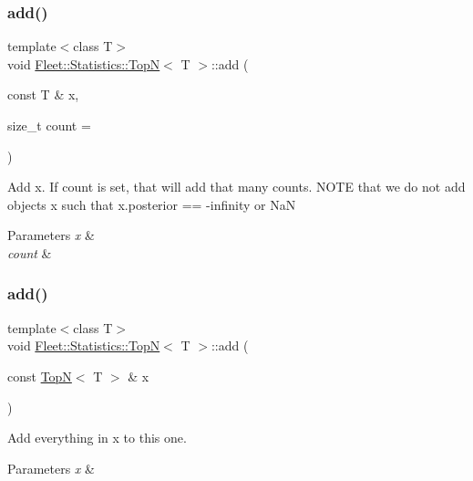 \subsubsection{\texorpdfstring{add()}{add()}\hspace{0.1cm}{\footnotesize\ttfamily [1/2]}}
{\footnotesize\ttfamily template$<$class T$>$ \\
void \hyperlink{class_fleet_1_1_statistics_1_1_top_n}{Fleet\+::\+Statistics\+::\+TopN}$<$ T $>$\+::add (\begin{DoxyParamCaption}\item[{const T \&}]{x,  }\item[{size\+\_\+t}]{count = {} }\end{DoxyParamCaption})\hspace{0.3cm}{\ttfamily [inline]}}

Add x. If count is set, that will add that many counts. N\+O\+TE that we do not add objects x such that x.\+posterior == -\/infinity or NaN 
\begin{DoxyParams}{Parameters}
{\em x} & \\
\hline
{\em count} & \\
\hline
\end{DoxyParams}
\mbox{\label{class_fleet_1_1_statistics_1_1_top_n_ac1a720c5f52f0486377274bd1e6a052a}} 
\subsubsection{\texorpdfstring{add()}{add()}\hspace{0.1cm}{\footnotesize\ttfamily [2/2]}}
{\footnotesize\ttfamily template$<$class T$>$ \\
void \hyperlink{class_fleet_1_1_statistics_1_1_top_n}{Fleet\+::\+Statistics\+::\+TopN}$<$ T $>$\+::add (\begin{DoxyParamCaption}\item[{const \hyperlink{class_fleet_1_1_statistics_1_1_top_n}{TopN}$<$ T $>$ \&}]{x }\end{DoxyParamCaption})\hspace{0.3cm}{\ttfamily [inline]}}

Add everything in x to this one. 
\begin{DoxyParams}{Parameters}
{\em x} & \\
\hline
\end{DoxyParams}
\mbox{\label{class_fleet_1_1_statistics_1_1_top_n_a61aa70a203ecf97f79d26cb4bcfe2071}} 

